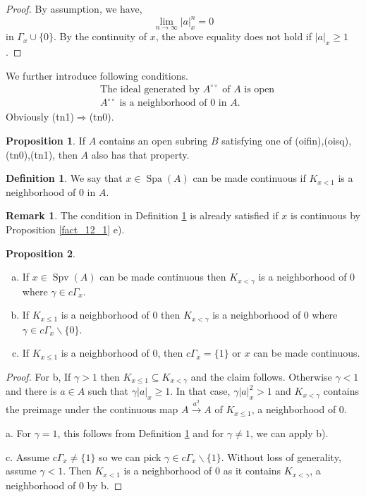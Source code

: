 \documentclass[10pt]{article}
\numberwithin{equation}{section}
\theoremstyle{definition}
\newtheorem{proposition}{Proposition}[subsection]
\newtheorem{definition}{Definition}[subsection]
\newtheorem{remark}{Remark}[subsection]
\DeclareMathOperator{\Spa}{Spa}
\DeclareMathOperator{\Spv}{Spv}
\newcommand{\ab}[1]{\vert #1 \vert}
\newcommand{\cGamma}[0]{c\Gamma}
\newcommand{\dcirc}[0]{{\circ\circ}}
\begin{document}
\begin{proof}
    By assumption, we have,
    \begin{equation*}
        \lim_{n\to\infty}\ab{a}_x^n = 0
    \end{equation*}
    in $\Gamma_x\cup\{0\}$. By the continuity of $x$, the above equality does not hold if $\ab{a}_x\geq1$.
\end{proof}
We further introduce following conditions.
\begin{align*}
    &\text{The ideal generated by $A^{\dcirc}$ of $A$ is open}\tag{tn0}\\
    &\text{$A^{\dcirc}$ is a neighborhood of $0$ in $A$.}\tag{tn1}
\end{align*}
Obviously (tn1)$\Rightarrow$(tn0).
\begin{proposition}
    \label{fact_13_7}
    If $A$ contains an open subring $B$ satisfying one of (oifin),(oisq), (tn0),(tn1), then $A$ also has that property.
\end{proposition}
\begin{definition}
    \label{definition_13_4}
    We say that $x\in\Spa(A)$ can be made continuous if $K_{x<1}$ is a neighborhood of $0$ in $A$.
\end{definition}
\begin{remark}
    The condition in Definition \ref{definition_13_4} is already satisfied if $x$ is continuous by Proposition \ref{fact_12_1} e).
\end{remark}
\begin{proposition}$\:$
    \label{fact_13_8}
    \begin{enumerate}[a.]
        \item If $x\in\Spv(A)$ can be made continuous then $K_{x<\gamma}$ is a neighborhood of $0$ where $\gamma\in\cGamma_x$.
        \item If $K_{x\leq 1}$ is a neighborhood of $0$ then $K_{x<\gamma}$ is a neighborhood of $0$ where $\gamma\in\cGamma_x\backslash\{0\}$.
        \item If $K_{x\leq 1}$ is a neighborhood of $0$, then $\cGamma_x=\{1\}$ or $x$ can be made continuous.
    \end{enumerate}
\end{proposition}
\begin{proof}
    For b, If $\gamma>1$ then $K_{x\leq1}\subseteq K_{x<\gamma}$ and the claim follows. Otherwise $\gamma<1$ and there is $a\in A$ such that $\gamma\ab{a}_x\geq1$. In that case, $\gamma\ab{a}_x^2>1$ and $K_{x<\gamma}$ contains the preimage under the continuous map $A\stackrel{a^2}{\to} A$ of $K_{x\leq1}$, a neighborhood of $0$.
    \par a. For $\gamma=1$, this follows from Definition \ref{definition_13_4} and for $\gamma\not=1$, we can apply b).
    \par c. Assume $\cGamma_x\not=\{1\}$ so we can pick $\gamma\in\cGamma_x\backslash\{1\}$. Without loss of generality, assume $\gamma<1$. Then $K_{x<1}$ is a neighborhood of $0$ as it contains $K_{x<\gamma}$, a neighborhood of $0$ by b.
\end{proof}
\end{document}
